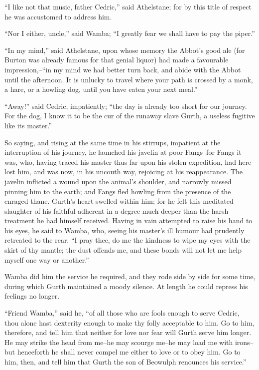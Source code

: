 ``I like not that music, father Cedric,'' said Athelstane; for by this
title of respect he was accustomed to address him.

``Nor I either, uncle,'' said Wamba; ``I greatly fear we shall have to
pay the piper.''

``In my mind,'' said Athelstane, upon whose memory the Abbot's good ale
(for Burton was already famous for that genial liquor) had made a
favourable impression,--``in my mind we had better turn back, and abide
with the Abbot until the afternoon. It is unlucky to travel where your
path is crossed by a monk, a hare, or a howling dog, until you have
eaten your next meal.''

``Away!'' said Cedric, impatiently; ``the day is already too short for
our journey. For the dog, I know it to be the cur of the runaway slave
Gurth, a useless fugitive like its master.''

So saying, and rising at the same time in his stirrups, impatient at the
interruption of his journey, he launched his javelin at poor Fangs--for
Fangs it was, who, having traced his master thus far upon his stolen
expedition, had here lost him, and was now, in his uncouth way,
rejoicing at his reappearance. The javelin inflicted a wound upon the
animal's shoulder, and narrowly missed pinning him to the earth; and
Fangs fled howling from the presence of the enraged thane. Gurth's heart
swelled within him; for he felt this meditated slaughter of his faithful
adherent in a degree much deeper than the harsh treatment he had himself
received. Having in vain attempted to raise his hand to his eyes, he
said to Wamba, who, seeing his master's ill humour had prudently
retreated to the rear, ``I pray thee, do me the kindness to wipe my eyes
with the skirt of thy mantle; the dust offends me, and these bonds will
not let me help myself one way or another.''

Wamba did him the service he required, and they rode side by side for
some time, during which Gurth maintained a moody silence. At length he
could repress his feelings no longer.

``Friend Wamba,'' said he, ``of all those who are fools enough to serve
Cedric, thou alone hast dexterity enough to make thy folly acceptable to
him. Go to him, therefore, and tell him that neither for love nor fear
will Gurth serve him longer. He may strike the head from me--he may
scourge me--he may load me with irons--but henceforth he shall never
compel me either to love or to obey him. Go to him, then, and tell him
that Gurth the son of Beowulph renounces his service.''

